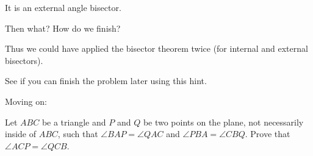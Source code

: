 







It is an external angle bisector.

Then what? How do we finish?


Thus we could have applied the bisector theorem twice (for internal and external bisectors).

See if you can finish the problem later using this hint.

Moving on:

\begin{example}
    Let $ABC$ be a triangle and $P$ and $Q$ be two points on the plane, not necessarily inside of $ABC$, such that $\angle BAP = \angle QAC$ and $\angle PBA = \angle CBQ$. Prove that $\angle ACP = \angle QCB$.    
\end{example}





